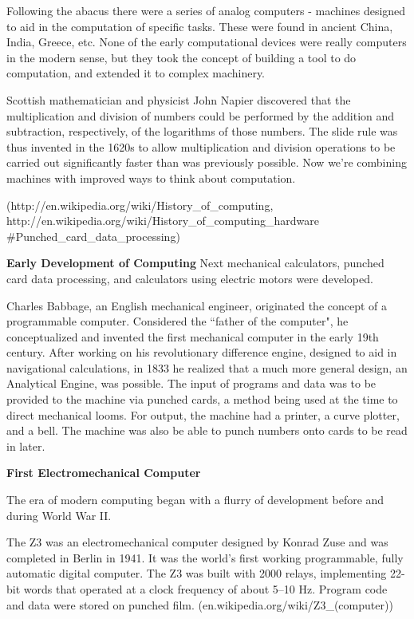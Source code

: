 \documentclass[12pt, ]{article}
\begin{document}
Following the abacus there were a series of analog computers - machines designed to aid in the computation of specific tasks. These were found in ancient China, India, Greece, etc. None of the early computational devices were really computers in the modern sense, but they took the concept of building a tool to do computation, and extended it to complex machinery.

Scottish mathematician and physicist John Napier discovered that the multiplication and division of numbers could be performed by the addition and subtraction, respectively, of the logarithms of those numbers. The slide rule was thus invented in the 1620s to allow multiplication and division operations to be carried out significantly faster than was previously possible. Now we're combining machines with improved ways to think about computation.

 (http://en.wikipedia.org/wiki/History\_of\_computing,\\ http://en.wikipedia.org/wiki/History\_of\_computing\_hardware\\
 \#Punched\_card\_data\_processing)

\vspace*{2em}
\noindent \textbf{Early Development of Computing}
Next mechanical calculators, punched card data processing, and calculators using electric motors were developed. 

Charles Babbage, an English mechanical engineer, originated the concept of a programmable computer. Considered the ``father of the computer", he conceptualized and invented the first mechanical computer in the early 19th century. After working on his revolutionary difference engine, designed to aid in navigational calculations, in 1833 he realized that a much more general design, an Analytical Engine, was possible. The input of programs and data was to be provided to the machine via punched cards, a method being used at the time to direct mechanical looms. For output, the machine had a printer, a curve plotter, and a bell. The machine was also be able to punch numbers onto cards to be read in later. 

\vspace*{2em}
\noindent \textbf{First Electromechanical Computer}

The era of modern computing began with a flurry of development before and during World War II. 

The Z3 was an electromechanical computer designed by Konrad Zuse and was completed in Berlin in 1941. It was the world's first working programmable, fully automatic digital computer. The Z3 was built with 2000 relays, implementing 22-bit words that operated at a clock frequency of about 5–10 Hz. Program code and data were stored on punched film. (en.wikipedia.org/wiki/Z3\_(computer))
\end{document}
